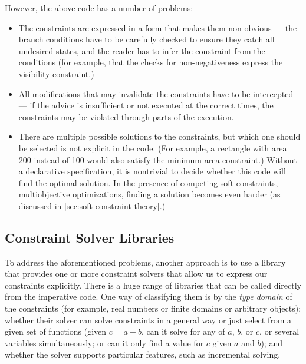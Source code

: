 However, the above code has a number of problems:
\begin{itemize}
\item The constraints are expressed in a form that makes them
  non-obvious --- the branch conditions have to be carefully checked to
  ensure they catch all undesired states, and the reader has to infer
  the constraint from the conditions (for example, that the checks for
  non-negativeness express the visibility constraint.)
\item All modifications that may invalidate the constraints have to be
  intercepted --- if the advice is insufficient or not executed at the
  correct times, the constraints may be violated through parts of the
  execution.
\item There are multiple possible solutions to the constraints, but
  which one should be selected is not explicit in the code.  (For
  example, a rectangle with area 200 instead of 100 would also satisfy
  the minimum area constraint.)  Without a declarative specification,
  it is nontrivial to decide whether this code will find the optimal
  solution. In the presence of competing soft constraints, \ie
  multiobjective optimizations, finding a solution becomes even harder
  (as discussed in \autoref{sec:soft-constraint-theory}.)
\end{itemize}

\subsection{Constraint Solver Libraries}

To address the aforementioned problems, another approach is to use a
library that provides one or more constraint solvers that allow us to
express our constraints explicitly. There is a huge range of libraries
that can be called directly from the imperative code.  One way of
classifying them is by the \emph{type domain} of the constraints (for
example, real numbers or finite domains or arbitrary objects); whether
their solver can solve constraints in a general way or just select
from a given set of functions (\eg given $c=a+b$, can it solve for any of
$a$, $b$, or $c$, or several variables simultaneously; 
or can it only find a value for $c$ given $a$ and $b$); 
and whether the solver supports particular features, such
as incremental solving.


